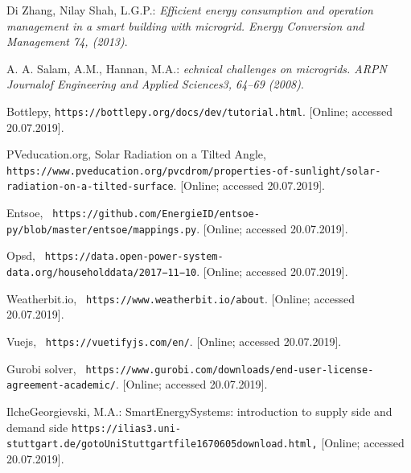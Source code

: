 \documentclass[runningheads]{llncs}
\begin{document}
%
%
\begin{thebibliography}{9}
Di Zhang, Nilay Shah, L.G.P.:
\textit{ Efficient energy consumption and operation management in a smart building with microgrid. Energy Conversion and Management 74, (2013)}. 

A. A. Salam, A.M., Hannan, M.A.: 
\textit{ echnical challenges on microgrids. ARPN Journalof Engineering and Applied Sciences3, 64–69 (2008)}. 

Bottlepy,
\texttt{https://bottlepy.org/docs/dev/tutorial.html}. 
[Online; accessed 20.07.2019].

PVeducation.org, Solar Radiation on a Tilted Angle,
\texttt{https://www.pveducation.org/pvcdrom/properties-of-sunlight/solar-radiation-on-a-tilted-surface}. 
[Online; accessed 20.07.2019].

Entsoe, 
\texttt{ https://github.com/EnergieID/entsoe-py/blob/master/entsoe/mappings.py}. 
[Online; accessed 20.07.2019].

Opsd, 
\texttt{ https://data.open-power-system-data.org/householddata/2017−11−10}. 
[Online; accessed 20.07.2019].
 
Weatherbit.io, 
\texttt{ https://www.weatherbit.io/about}. 
[Online; accessed 20.07.2019]. 

Vuejs, 
\texttt{ https://vuetifyjs.com/en/}. 
[Online; accessed 20.07.2019]. 

Gurobi solver, 
\texttt{ https://www.gurobi.com/downloads/end-user-license-agreement-academic/}. 
[Online; accessed 20.07.2019]. 

IlcheGeorgievski, M.A.: SmartEnergySystems: introduction to supply side and demand side
\texttt{https://ilias3.uni-stuttgart.de/gotoUniStuttgartfile1670605download.html,} 
[Online; accessed 20.07.2019].

\end{thebibliography}
 
\end{document}
